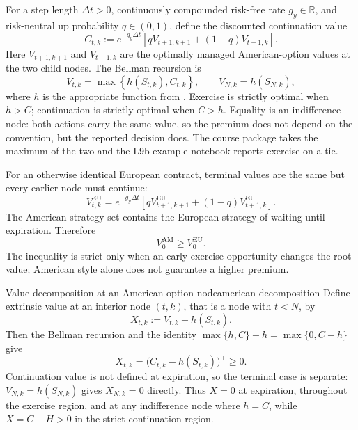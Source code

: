 \documentclass[11pt]{article}
\newcommand{\R}{\mathbb{R}}
\begin{document}
For a step length $\Delta t>0$, continuously compounded risk-free rate $g_y\in\R$, and risk-neutral up probability $q\in(0,1)$, define the discounted continuation value
\begin{equation}
  \label{eq:continuation}
  C_{t,k}:=e^{-g_y\Delta t}
  \left[qV_{t+1,k+1}+(1-q)V_{t+1,k}\right].
\end{equation}
Here $V_{t+1,k+1}$ and $V_{t+1,k}$ are the optimally managed American-option values at the two child nodes. The Bellman recursion is
\begin{equation}
  \label{eq:bellman}
  V_{t,k}=\max\!\left\{h(S_{t,k}),C_{t,k}\right\},
  \qquad
  V_{N,k}=h(S_{N,k}),
\end{equation}
where $h$ is the appropriate function from . Exercise is strictly optimal when $h>C$; continuation is strictly optimal when $C>h$. Equality is an indifference node: both actions carry the same value, so the premium does not depend on the convention, but the reported decision does. The course package takes the maximum of the two and the L9b example notebook reports exercise on a tie.

For an otherwise identical European contract, terminal values are the same but every earlier node must continue:
\begin{equation}
  \label{eq:european-recursion}
  V_{t,k}^{\mathrm{EU}}=e^{-g_y\Delta t}
  \left[qV_{t+1,k+1}^{\mathrm{EU}}+(1-q)V_{t+1,k}^{\mathrm{EU}}\right].
\end{equation}
The American strategy set contains the European strategy of waiting until expiration. Therefore
\begin{equation}
  \label{eq:american-dominates-european}
  V_0^{\mathrm{AM}}\geq V_0^{\mathrm{EU}}.
\end{equation}
The inequality is strict only when an early-exercise opportunity changes the root value; American style alone does not guarantee a higher premium.

\begin{theorem}{Value decomposition at an American-option node}{american-decomposition}
Define extrinsic value at an interior node $(t,k)$, that is a node with $t<N$, by
\begin{equation}
  \label{eq:extrinsic}
  X_{t,k}:=V_{t,k}-h(S_{t,k}).
\end{equation}
Then the Bellman recursion  and the identity $\max\{h,C\}-h=\max\{0,C-h\}$ give
\begin{equation}
  \label{eq:extrinsic-positive-part}
  X_{t,k}=\bigl(C_{t,k}-h(S_{t,k})\bigr)^+\geq 0.
\end{equation}
Continuation value is not defined at expiration, so the terminal case is separate: $V_{N,k}=h(S_{N,k})$ gives $X_{N,k}=0$ directly. Thus $X=0$ at expiration, throughout the exercise region, and at any indifference node where $h=C$, while $X=C-H>0$ in the strict continuation region.
\end{theorem}
\end{document}
